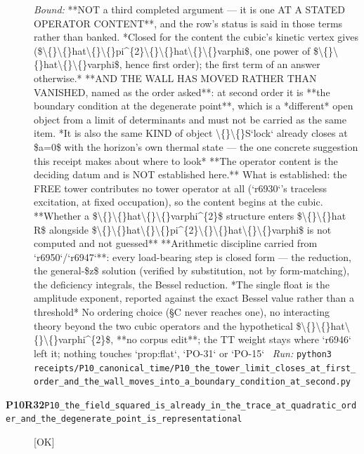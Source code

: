 \begin{description}
 \emph{Bound:}  **NOT a third completed argument --- it is one AT A STATED OPERATOR CONTENT**, and the row's status is said in those terms rather than banked. *Closed for the content the cubic's kinetic vertex gives (\$\textbackslash\{\}\textbackslash\{\}hat\textbackslash\{\}\textbackslash\{\}pi\textasciicircum{}\{2\}\textbackslash\{\}\textbackslash\{\}hat\textbackslash\{\}\textbackslash\{\}varphi\$, one power of \$\textbackslash\{\}\textbackslash\{\}hat\textbackslash\{\}\textbackslash\{\}varphi\$, hence first order); the first term of an answer otherwise.*  **AND THE WALL HAS MOVED RATHER THAN VANISHED, named as the order asked**: at second order it is **the boundary condition at the degenerate point**, which is a *different* open object from a limit of determinants and must not be carried as the same item.  *It is also the same KIND of object \textbackslash\{\}\textbackslash\{\}S`lock` already closes at \$a=0\$ with the horizon's own thermal state --- the one concrete suggestion this receipt makes about where to look*  **The operator content is the deciding datum and is NOT established here.** What is established: the FREE tower contributes no tower operator at all (`r6930`'s traceless excitation, at fixed occupation), so the content begins at the cubic. **Whether a \$\textbackslash\{\}\textbackslash\{\}hat\textbackslash\{\}\textbackslash\{\}varphi\textasciicircum{}\{2\}\$ structure enters \$\textbackslash\{\}\textbackslash\{\}hat R\$ alongside \$\textbackslash\{\}\textbackslash\{\}hat\textbackslash\{\}\textbackslash\{\}pi\textasciicircum{}\{2\}\textbackslash\{\}\textbackslash\{\}hat\textbackslash\{\}\textbackslash\{\}varphi\$ is not computed and not guessed**  **Arithmetic discipline carried from `r6950`/`r6947`**: every load-bearing step is closed form --- the reduction, the general-\$z\$ solution (verified by substitution, not by form-matching), the deficiency integrals, the Bessel reduction. *The single float is the amplitude exponent, reported against the exact Bessel value rather than a threshold*  No ordering choice (\S{}C never reaches one), no interacting theory beyond the two cubic operators and the hypothetical \$\textbackslash\{\}\textbackslash\{\}hat\textbackslash\{\}\textbackslash\{\}varphi\textasciicircum{}\{2\}\$, **no corpus edit**; the TT weight stays where `r6946` left it; nothing touches `prop:flat`, `PO-31` or `PO-15`
\ \emph{Run:} \texttt{python3 receipts/P10\_canonical\_time/P10\_the\_tower\_limit\_closes\_at\_first\_order\_and\_the\_wall\_moves\_into\_a\_boundary\_condition\_at\_second.py}
\item[\rcptlabel{P10_the_field_squared_is_already_in_the_trace_at_quadratic_order_and_the_degenerate_point_is_representational}{P10R32}\textbf{P10R32}\quad\texttt{P10\_the\_field\_squared\_is\_already\_in\_the\_trace\_at\_quadratic\_order\_and\_the\_degenerate\_point\_is\_representational}]\hfill\textsf{[OK]}\\

\end{description}
